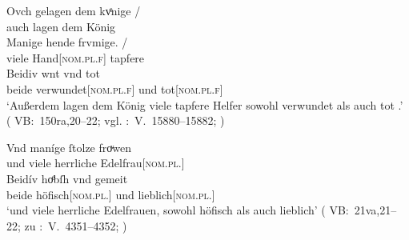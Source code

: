\begin{exe}
\begin{xlist}
	\ex \label{ex:konjadjvvbeidiu_4} %
		\gll Ovch gelagen dem kvͤnige {/} \\
			auch lagen dem König \\
		\gll Manige hende frvmige. {/} \\
			viele Hand[\textsc{nom.pl.f\subM}] tapfere \\
		\gll Beidiv wnt vnd tot \\
			beide verwundet[\textsc{nom.pl.f\subM}] und
			tot[\textsc{nom.pl.f\subM}] \\
		\trans `Außerdem lagen dem König viele tapfere Helfer
			sowohl verwundet als auch tot .'
			(%
				VB:~150ra,20--22; vgl.
				\KC:~V.~15880--15882;
				\cite[363]{schroeder1895}%
			)


	\ex \label{ex:konjadjvvbeidiu_6} %
		\gll Vnd maníge ſtolze froͮwen \\
			und viele herrliche Edelfrau[\textsc{nom.pl.\FemF}] \\
	\sn \gll Beidív hoͤbſh vnd gemeit \\
			beide höfisch[\textsc{nom.pl.\FemF}] und lieblich[\textsc{nom.pl.\FemF}] \\
		\trans `und viele herrliche Edelfrauen,  sowohl
			höfisch als auch lieblich'
			(%
				VB:~21va,21--22; zu
				\KC:~V.~4351--4352;
				\cite[161]{schroeder1895}%
			)
	\end{xlist}
\end{exe}

